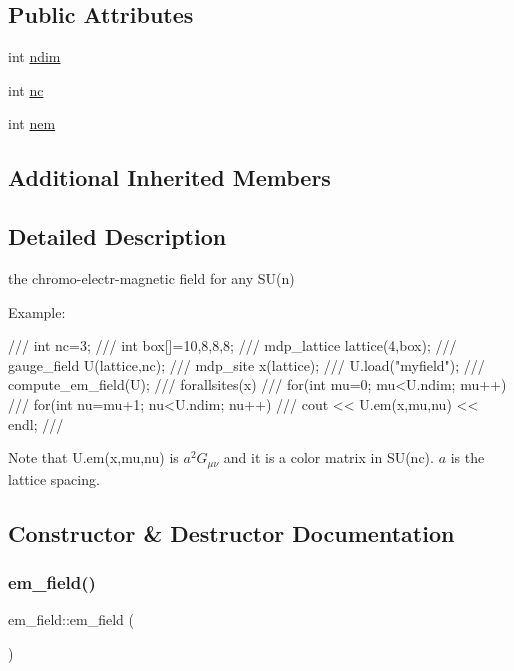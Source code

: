 \subsection*{Public Attributes}
\begin{DoxyCompactItemize}
\item 
int \hyperlink{classem__field_ad35fcd68bba9a301d34ceabc76f08226}{ndim}
\item 
int \hyperlink{classem__field_ab6fc146b5a94cf5961a133e55f832cd4}{nc}
\item 
int \hyperlink{classem__field_ab0049c2b2edc267a93c9299aecede037}{nem}
\end{DoxyCompactItemize}
\subsection*{Additional Inherited Members}


\subsection{Detailed Description}
the chromo-\/electr-\/magnetic field for any S\+U(n) 

Example\+: \begin{DoxyVerb}///    int nc=3; 
///    int box[]={10,8,8,8};
///    mdp_lattice lattice(4,box);
///    gauge_field U(lattice,nc);
///    mdp_site x(lattice);
///    U.load("myfield");
///    compute_em_field(U);
///    forallsites(x)
///      for(int mu=0; mu<U.ndim; mu++)
///        for(int nu=mu+1; nu<U.ndim; nu++)
///          cout << U.em(x,mu,nu) << endl;
/// \end{DoxyVerb}
 Note that U.\+em(x,mu,nu) is $ a^2 G_{\mu\nu} $ and it is a color matrix in S\+U(nc). $a$ is the lattice spacing. 

\subsection{Constructor \& Destructor Documentation}
\mbox{\label{classem__field_a919bf7292d3c2748663f48d325ea2fa3}} 
\subsubsection{\texorpdfstring{em\+\_\+field()}{em\_field()}\hspace{0.1cm}{\footnotesize\ttfamily [1/3]}}
{\footnotesize\ttfamily em\+\_\+field\+::em\+\_\+field (\begin{DoxyParamCaption}{ }\end{DoxyParamCaption})\hspace{0.3cm}{\ttfamily [inline]}}

